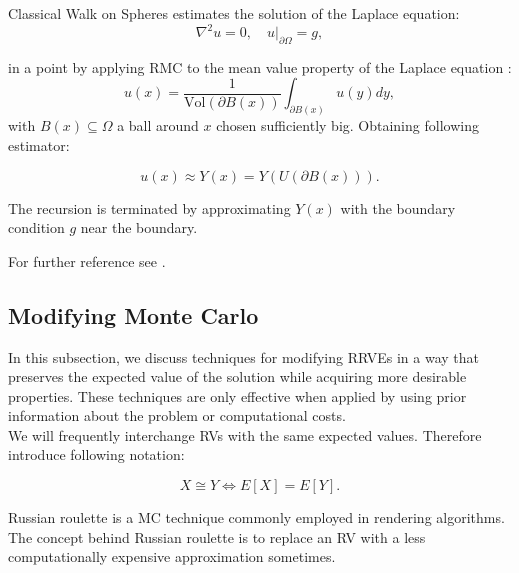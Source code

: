 \documentclass[a4paper,12pt]{article}
\begin{document}
\begin{example}
  Classical Walk on Spheres estimates the solution of the Laplace equation:
  \begin{equation} \label{eq:laplace}
    \nabla^2 u = 0, \quad u|_{\partial \Omega} = g,
  \end{equation}

  in a point by applying RMC to the mean value property of the Laplace equation :
  \begin{equation}\label{eq:mean value}
    u(x) = \frac{1}{\text{Vol}(\partial B(x))} \int_{\partial B(x)} u(y) dy,
  \end{equation}
  with $B(x) \subseteq \Omega$ a ball around $x$ chosen sufficiently big.
  Obtaining following estimator:

  \begin{equation}
    u(x) \approx Y(x) = Y(U(\partial B(x)))
    .
  \end{equation}

  The recursion is terminated by approximating $Y(x)$ with the boundary condition $g$
  near the boundary.
\end{example}

\begin{related}
  For further reference see \cite{sawhney_monte_nodate}.
\end{related}


\subsection{Modifying Monte Carlo}

In this subsection, we discuss techniques for modifying RRVEs
in a way that preserves the expected value of the solution while
acquiring more desirable properties. These techniques are only
effective when applied by using prior information
about the problem or computational costs. \\

We will frequently interchange RVs with the same expected values.
Therefore introduce following notation:
\begin{notation}[$\cong$]
  \[
    X \cong Y \iff E[X]=E[Y]
    .\]
\end{notation}

Russian roulette is a MC technique commonly employed in rendering algorithms.
The concept behind Russian roulette is to replace an RV with a
less computationally expensive approximation sometimes.
\end{document}
